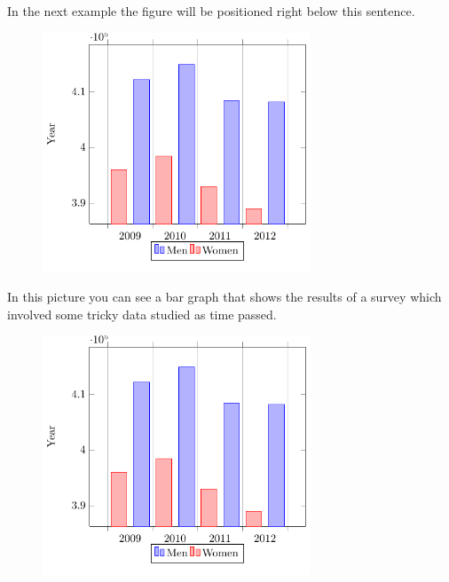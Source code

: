 \documentclass{article}
\begin{document}
\vspace{1.5cm}

In the next example the figure will be positioned right below this sentence.

\begin{figure}[h]
\includegraphics[width=8cm]{Plot}
\end{figure}

\newpage

In this picture you can see a bar graph that shows
the results of a survey which involved some tricky
data studied as time passed.

\begin{figure}[t]
\centering
\includegraphics[width=8cm]{Plot}
\end{figure}

\newpage
\end{document}
